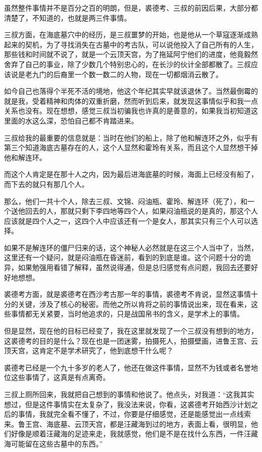 虽然整件事情并不是百分之百的明朗，但是，裘德考、三叔的前因后果，大部分都清楚了，不知道的，也就是两三件事情。

三叔方面，在海底墓穴中的经历，是三叔噩梦的开始，也是他从一个草寇逐渐成熟起来的契机，为了寻找消失在古墓中的考古队，可以说他投入了自己所有的人生，那些钱和时间就不说了，就是一个云顶天宫，为了拖延阿宁他们的进度，他竟毅然舍弃了自己的事业，除了少数几个特别忠心的，在长沙的伙计全部都散了。三叔应该说是老九门的后裔里一个数一数二的人物，现在一切都烟消云散了。

如今自己也落得个半死不活的境地，他这个年纪其实早就该退休了。当然最倒霉的就是我，受着精神和肉体的双重折磨，然而听到后来，就发现这事情似乎和我一点关系也没有。现在想想，感觉三叔当初骗我也许真的是善意的，如果我当初知道这里面的水这么深，恐怕自己都不肯踏进来。

三叔给我的最重要的信息就是：当时在他们的船上，除了他和解连环之外，似乎有第三个知道海底古墓存在的人，这个人显然和霍玲有关系，而且这个人显然想干掉他和解连环。

而这个人肯定是在那十人之内，因为最后进海底墓的时候，海面上已经没有船了，而下去的就只有那几个人。

那么，他们一共十个人，除去三叔、文锦、闷油瓶、霍玲、解连环（死了），和一个送他回去的人，那就只剩下李四地等四个人，如果闷油瓶说的是真的，那这个人应该就是四个人之一，这四个人中应该还有一个是女人，那其实只有三个人可以选择。

如果不是解连环的僵尸归来的话，这个神秘人必然就是在这三个人当中了，当然，这里还有一个疑问，就是闷油瓶在昏迷前，看到的到底是谁。这个问题十分的诡异，如果勉强用看错了解释，虽然说得通，但是总归感觉有点问题，我回去还要好好地想想。

裘德考方面，就是裘德考在西沙考古那一年的事情，裘德考不肯说，显然这事情十分的关键，涉及了核心的秘密。而他之所以肯将之前的事情说出来，现在看来，这些事情都无关紧要，当时他追求的，只是战国帛书的含义，是学术上的事情。

但是显然，现在他的目标已经变了，我在这里就发现了一个三叔没有想到的地方，这裘德考的目的是什么？现在也是一团迷雾，拍摄死人，拍摄壁画，进鲁王宫、云顶天宫，这肯定不是学术研究了，他到底想干什么呢？

裘德考已经是一个九十多岁的老人了，他还在做这件事情，显然不为钱或者名誉地位这些事情了，这真是有点离奇。

三叔上厕所回来，我就把自己想到的事情和他说了。他点头，对我道：“这我其实想过，但是这件事情实在太复杂了，我没法来说，你看，这裘德考开始西沙计划之后的事情，我就完全看不懂了，不过，你要是仔细感觉，还是能感觉出一点线索来。鲁王宫、海底墓、云顶天宫，都是汪藏海到过的地方，表面上看，很明显，他们好像是顺着汪藏海的足迹来走，我就感觉，他们是不是在找什么东西，一件汪藏海可能留在这些古墓中的东西。”

